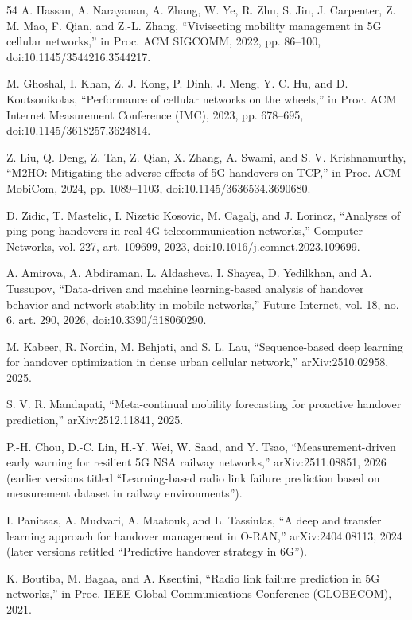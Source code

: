 \begin{thebibliography}{54}
 A. Hassan, A. Narayanan, A. Zhang, W. Ye, R. Zhu, S. Jin, J. Carpenter, Z. M. Mao, F. Qian, and Z.-L. Zhang, ``Vivisecting mobility management in 5G cellular networks,'' in Proc. ACM SIGCOMM, 2022, pp. 86--100, doi:10.1145/3544216.3544217.

 M. Ghoshal, I. Khan, Z. J. Kong, P. Dinh, J. Meng, Y. C. Hu, and D. Koutsonikolas, ``Performance of cellular networks on the wheels,'' in Proc. ACM Internet Measurement Conference (IMC), 2023, pp. 678--695, doi:10.1145/3618257.3624814.

 Z. Liu, Q. Deng, Z. Tan, Z. Qian, X. Zhang, A. Swami, and S. V. Krishnamurthy, ``M2HO: Mitigating the adverse effects of 5G handovers on TCP,'' in Proc. ACM MobiCom, 2024, pp. 1089--1103, doi:10.1145/3636534.3690680.

 D. Zidic, T. Mastelic, I. Nizetic Kosovic, M. Cagalj, and J. Lorincz, ``Analyses of ping-pong handovers in real 4G telecommunication networks,'' Computer Networks, vol. 227, art. 109699, 2023, doi:10.1016/j.comnet.2023.109699.

 A. Amirova, A. Abdiraman, L. Aldasheva, I. Shayea, D. Yedilkhan, and A. Tussupov, ``Data-driven and machine learning-based analysis of handover behavior and network stability in mobile networks,'' Future Internet, vol. 18, no. 6, art. 290, 2026, doi:10.3390/fi18060290.

 M. Kabeer, R. Nordin, M. Behjati, and S. L. Lau, ``Sequence-based deep learning for handover optimization in dense urban cellular network,'' arXiv:2510.02958, 2025.

 S. V. R. Mandapati, ``Meta-continual mobility forecasting for proactive handover prediction,'' arXiv:2512.11841, 2025.

 P.-H. Chou, D.-C. Lin, H.-Y. Wei, W. Saad, and Y. Tsao, ``Measurement-driven early warning for resilient 5G NSA railway networks,'' arXiv:2511.08851, 2026 (earlier versions titled ``Learning-based radio link failure prediction based on measurement dataset in railway environments'').

 I. Panitsas, A. Mudvari, A. Maatouk, and L. Tassiulas, ``A deep and transfer learning approach for handover management in O-RAN,'' arXiv:2404.08113, 2024 (later versions retitled ``Predictive handover strategy in 6G'').

 K. Boutiba, M. Bagaa, and A. Ksentini, ``Radio link failure prediction in 5G networks,'' in Proc. IEEE Global Communications Conference (GLOBECOM), 2021.


\end{thebibliography}
